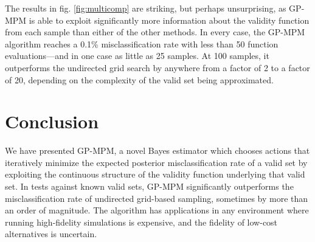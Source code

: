 \documentclass[letterpaper, 10 pt, conference]{ieeeconf}
\begin{document}
The results in fig. \ref{fig:multicomp} are striking, but perhaps unsurprising, as GP-MPM is able to exploit significantly more information about the validity function from each sample than either of the other methods. In every case, the GP-MPM algorithm reaches a 0.1\% misclassification rate with less than 50 function evaluations---and in one case as little as 25 samples. At 100 samples, it outperforms the undirected grid search by anywhere from a factor of 2 to a factor of 20, depending on the complexity of the valid set being approximated.

\section{Conclusion}

We have presented GP-MPM, a novel Bayes estimator which chooses actions that iteratively minimize the expected posterior misclassification rate of a valid set by exploiting the continuous structure of the validity function underlying that valid set. In tests against known valid sets, GP-MPM significantly outperforms the misclassification rate of undirected grid-based sampling, sometimes by more than an order of magnitude. The algorithm has applications in any environment where running high-fidelity simulations is expensive, and the fidelity of low-cost alternatives is uncertain.
\end{document}
